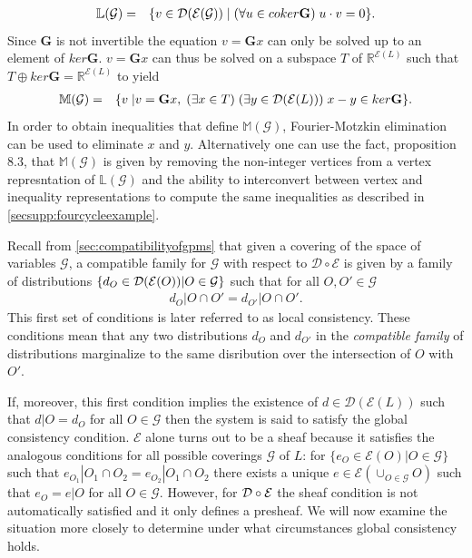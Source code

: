 \begin{eqnarray}\label{eq:localpolytope}
\mathbb{L}(\mathcal{G}) &=& \{ v \in \mathcal{D}{}(\mathcal{E}{}(\mathcal{G})) \; | \; (\forall u \in coker \mathbf{G}) \; u \cdot v = 0\}.
\end{eqnarray}
Since $\mathbf{G}$ is not invertible the equation $v = \mathbf{G}x$ can only be solved up to an element of $ker \mathbf{G}$. $v = \mathbf{G}x$ can thus be solved on a subspace $T$ of $\mathbb{R}^{\mathcal{E}(L)}$ such that $T \oplus ker \mathbf{G} = \mathbb{R}^{\mathcal{E}(L)}$ to yield
\begin{eqnarray}\label{eq:globalpolytope}
\mathbb{M}(\mathcal{G}) &=& \{ v \; | v = \mathbf{G} x,\; (\exists x \in T) \; (\exists y \in \mathcal{D}{}(\mathcal{E}{}(L)))\; x-y \in ker \mathbf{G}  \}.
\end{eqnarray}
In order to obtain inequalities that define $\mathbb{M}(\mathcal{G})$, Fourier-Motzkin elimination can be used to eliminate $x$ and $y$. Alternatively one can use the fact, \cite{Wainwright2007} proposition 8.3, that $\mathbb{M}(\mathcal{G})$ is given by removing the non-integer vertices from a vertex represntation of $\mathbb{L}(\mathcal{G})$ and the ability to interconvert between vertex and inequality representations to compute the same inequalities as described in  \autoref{secsupp:fourcycleexample}.

Recall from \autoref{sec:compatibilityofgpms} that given a covering of the space of variables $\mathcal{G}$, a compatible family for $\mathcal{G}$ with respect to $\mathcal{D} \circ \mathcal{E}$ is given by a family of distributions $\{d_O \in \mathcal{D} (\mathcal{E}(O)) | O \in \mathcal{G}\}$ such that for all $O, O' \in \mathcal{G}$
\begin{eqnarray}
d_O|O \cap O' = d_{O'}|O \cap O'.
\end{eqnarray}
This first set of conditions is later referred to as local consistency. These conditions mean that any two distributions $d_O$ and $d_{O'}$ in the \emph{compatible family} of distributions marginalize to the same disribution over the intersection of $O$ with $O'$.

\noindent\makebox[\linewidth]{\rule{\paperwidth}{0.4pt}}

If, moreover, this first condition implies the existence of $d \in \mathcal{D}( \mathcal{E}(L))$ such that $d|O = d_O$ for all $O \in \mathcal{G}$ then the system is said to satisfy the global consistency condition.
$\mathcal{E}$ alone turns out to be a sheaf because it satisfies the analogous conditions for all possible coverings $\mathcal{G}$ of $L$: for $\{e_O \in \mathcal{E}(O) | O \in \mathcal{G}\}$ such that $e_{O_{1}} | O_1 \cap O_2 = e_{O_{2}} | O_1 \cap O_2$ there exists a unique $e \in \mathcal{E}(\cup_{O \in \mathcal{G}} O)$ such that $e_O = e|O$ for all $O \in \mathcal{G}$.  However, for $\mathcal{D} \circ \mathcal{E}$ the sheaf condition is not automatically satisfied and it only defines a presheaf.  We will now examine the situation more closely to determine under what circumstances global consistency holds.

